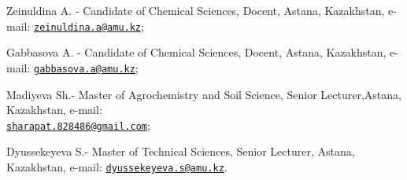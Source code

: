 \begin{authorinfo}
Zeinuldina A. - Candidate of Chemical Sciences, Docent, Astana,
Kazakhstan, e-mail:
\href{mailto:zeinuldina.a@amu.kz}{\nolinkurl{zeinuldina.a@amu.kz}};

Gabbasova A. - Candidate of Chemical Sciences, Docent, Astana,
Kazakhstan, e-mail:
\href{mailto:gabbasova.a@amu.kz}{\nolinkurl{gabbasova.a@amu.kz}};

Madiyeva Sh.- Master of Agrochemistry and Soil Science, Senior
Lecturer,Astana, Kazakhstan, e-mail:\\
\href{mailto:sharapat.828486@gmail.com}{\nolinkurl{sharapat.828486@gmail.com}};

Dyussekeyeva S.- Master of Technical Sciences, Senior Lecturer, Astana,
Kazakhstan, e-mail:
\href{mailto:dyussekeyeva.s@amu.kz}{\nolinkurl{dyussekeyeva.s@amu.kz}}.
\end{authorinfo}
